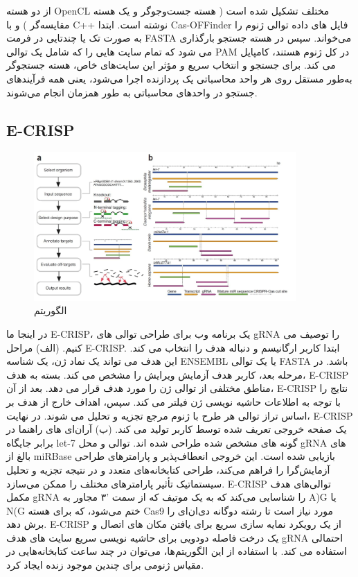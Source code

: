 \documentclass[12pt,a4paper,BCOR=.7cm,headsepline,bibliography=totoc]{report}
\begin{document}
 از دو هسته OpenCL مختلف تشکیل شده است
( هسته جست‌وجوگر و یک هسته مقایسه‌گر ) و با C++ نوشته است. ابتدا Cas-OFFinder فایل های داده توالی ژنوم را به صورت تک یا چندتایی در فرمت FASTA می‌خواند. سپس در هسته جستجو بارگذاری می شود که تمام سایت هایی را که شامل یک توالی PAM در کل ژنوم هستند، کامپایل می کند. برای جستجو و انتخاب سریع و مؤثر این سایت‌های خاص، هسته جستجوگر به‌طور مستقل روی هر واحد محاسباتی یک پردازنده اجرا می‌شود، یعنی همه فرآیندهای جستجو در واحدهای محاسباتی به طور همزمان انجام می‌شوند.


\subsection{E-CRISP ~\cite{E-CRISP}}
\begin{figure}
\centering
\includegraphics[width=10cm, ]{pictures/ecrispr.jpg}
\caption{
الگوریتم  \cite{E-CRISP}
}\label{wrap-fig:4}
\end{figure}

در اینجا ما E-CRISP، یک برنامه وب برای طراحی توالی های gRNA را توصیف می کنیم. (الف) مراحل E-CRISP. ابتدا کاربر ارگانیسم و دنباله هدف را انتخاب می کند. این هدف می تواند یک نماد ژن، یک شناسه ENSEMBL یا یک توالی FASTA باشد. در مرحله بعد، کاربر هدف آزمایش ویرایش را مشخص می کند. بسته به هدف، E-CRISP مناطق مختلفی از توالی ژن را مورد هدف قرار می دهد.
بعد از آن، E-CRISP نتایج را با توجه به اطلاعات حاشیه نویسی ژن فیلتر می کند. سپس، اهداف خارج از هدف بر اساس تراز توالی هر طرح با ژنوم مرجع تجزیه و تحلیل می شوند. در نهایت، E-CRISP یک صفحه خروجی تعریف شده توسط کاربر تولید می کند.
(ب) آر‌ان‌ای های راهنما در برابر جایگاه let-7 گونه های مشخص شده طراحی شده اند. توالی و محل gRNA های بالغ از miRBase بازیابی شده است. این خروجی انعطاف‌پذیر و پارامترهای طراحی آزمایش‌گرا را فراهم می‌کند، طراحی کتابخانه‌های متعدد و در نتیجه تجزیه و تحلیل سیستماتیک تأثیر پارامترهای مختلف را ممکن می‌سازد. E-CRISP توالی‌های هدف مکمل gRNA را شناسایی می‌کند که به یک موتیف که از سمت  '۳ مجاور به A)G یا N(G ختم می‌شود، که برای هسته Cas9 مورد نیاز است تا رشته دوگانه دی‌ان‌ای را برش دهد. E-CRISP از یک رویکرد نمایه سازی سریع برای یافتن مکان های اتصال و یک درخت فاصله دودویی برای حاشیه نویسی سریع سایت های هدف gRNA احتمالی استفاده می کند. با استفاده از این الگوریتم‌ها، می‌توان در چند ساعت کتابخانه‌هایی در مقیاس ژنومی برای چندین موجود زنده ایجاد کرد.
\end{document}

